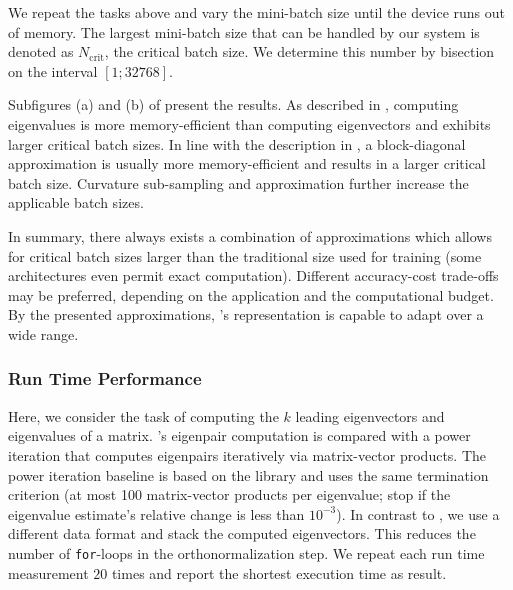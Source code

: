 We repeat the tasks above and vary the mini-batch size until the device runs out
of memory. The largest mini-batch size that can be handled by our system is
denoted as $N_{\text{crit}}$, the critical batch size. We determine this number
by bisection on the interval $[1; 32768]$.

Subfigures (a) and (b) of
present the results. As described in ,
computing eigenvalues is more memory-efficient than computing eigenvectors and
exhibits larger critical batch sizes. In line with the description in
, a block-diagonal approximation is usually more
memory-efficient and results in a larger critical batch size. Curvature
sub-sampling and \mc approximation further increase the applicable batch sizes.

In summary, there always exists a combination of approximations which allows for
critical batch sizes larger than the traditional size used for training (some
architectures even permit exact computation). Different accuracy-cost trade-offs
may be preferred, depending on the application and the computational budget. By
the presented approximations, \vivit's representation is capable to adapt over a
wide range.

\subsubsection{Run Time Performance}

Here, we consider the task of computing the $k$ leading eigenvectors and
eigenvalues of a matrix. \vivit{}'s eigenpair computation is compared with a
power iteration that computes eigenpairs iteratively via matrix-vector products.
The power iteration baseline is based on the \pyhessian library
\cite{yao2020pyhessian} and uses the same termination criterion (at most 100
matrix-vector products per eigenvalue; stop if the eigenvalue estimate's
relative change is less than $10^{-3}$). In contrast to \pyhessian, we use a
different data format and stack the computed eigenvectors. This reduces the
number of \texttt{for}-loops in the orthonormalization step. We repeat each run
time measurement $20$ times and report the shortest execution time as result.

